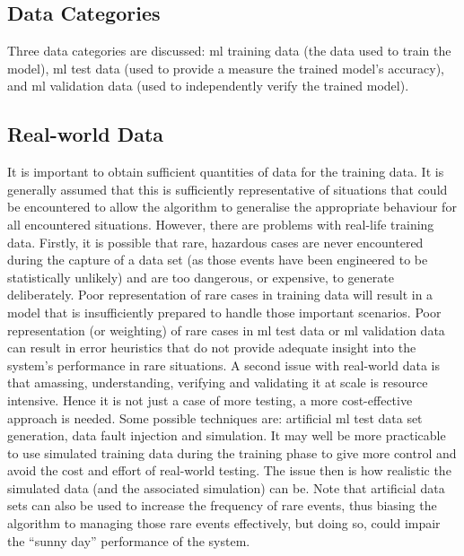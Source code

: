 \subsection{Data Categories}
Three data categories are discussed: \cbstart\gls{ml} training data (the data used to train the model)\cbend,
\gls{ml} test data (used to provide a measure the trained model’s \gls{accuracy}), and \gls{ml}
validation data (used to independently verify the trained model).  

\subsection{Real-world Data}
It is important to obtain sufficient quantities of data for the training data. It is generally assumed that this is sufficiently representative of situations that could be encountered to allow the algorithm to generalise the appropriate behaviour for all encountered situations.  However, there are problems with real-life training data. Firstly, it is possible that rare, hazardous cases are never encountered during the capture of a data set (as those events have been engineered to be statistically unlikely) and are too dangerous, or expensive, to generate deliberately. Poor representation of rare cases in training data will result in a model that is insufficiently prepared to handle those important scenarios. Poor representation (or weighting) of rare cases in
\gls{ml} test data or \gls{ml}
validation data can result in error heuristics that do not provide adequate insight into the system’s performance in rare situations. A second issue with real-world data is that amassing, understanding, verifying and validating it at scale is resource intensive.
Hence it is not just a case of more testing, a more cost-effective approach is needed. Some possible techniques are: artificial
\gls{ml}
test data set generation, data fault injection and simulation. It may well be more practicable to use simulated training data during the training phase to give more control and avoid the cost and effort of real-world testing. The issue then is how realistic the simulated data (and the associated simulation) can be. Note that artificial data sets can also be used to increase the frequency of rare events, thus biasing the algorithm to managing those rare events effectively, but doing so, could impair the ``sunny day'' performance of the system.

